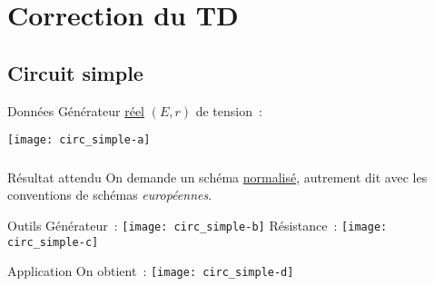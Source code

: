\documentclass[a4paper, 12pt, final, garamond]{book}
\begin{document}
\setcounter{chapter}{1}

\chapter{Correction du TD}

\section{Circuit simple}\label{ch2:ex1}
\begin{center}
    \begin{NCdefi}[width=.5\linewidth]{Données}
        Générateur \underline{réel} $(E,r)$ de tension~: \smallbreak
        \begin{center}
            \texttt{[image: circ\_simple-a]}
        \end{center}
    \end{NCdefi}
\end{center}

\subsection{}
\begin{tcbraster}[raster columns=3, raster equal height=rows]
    \begin{NCprop}{Résultat attendu}
        On demande un schéma \underline{normalisé}, autrement dit avec les
        conventions de schémas \textit{européennes}.
    \end{NCprop}
    \begin{NCrapp}{Outils}
        Générateur~:
        \texttt{[image: circ\_simple-b]}
        \smallbreak
        Résistance~:\vspace{12pt}
        \texttt{[image: circ\_simple-c]}
    \end{NCrapp}
    \begin{NCcexe}{Application}
        On obtient~: \smallbreak
        \texttt{[image: circ\_simple-d]}
    \end{NCcexe}
\end{tcbraster}
\end{document}
